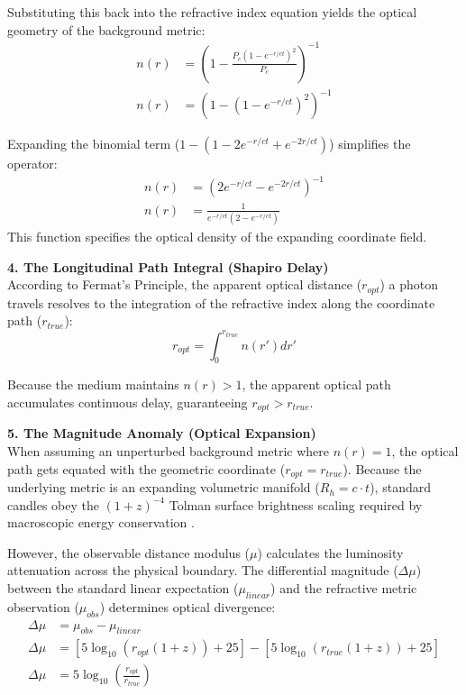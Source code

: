 Substituting this back into the refractive index equation yields the optical geometry of the background metric:
\begin{align}
    n(r) &= \left( 1 - \frac{P_c (1 - e^{-r/ct})^2}{P_c} \right)^{-1} \nonumber \\
    n(r) &= \left( 1 - (1 - e^{-r/ct})^2 \right)^{-1}
\end{align}

Expanding the binomial term ($1 - (1 - 2e^{-r/ct} + e^{-2r/ct})$) simplifies the operator:
\begin{align}
    n(r) &= \left( 2e^{-r/ct} - e^{-2r/ct} \right)^{-1} \nonumber \\
    n(r) &= \frac{1}{e^{-r/ct}(2 - e^{-r/ct})}
\end{align}
This function specifies the optical density of the expanding coordinate field.

\vspace{0.2 cm}

\textbf{4. The Longitudinal Path Integral (Shapiro Delay)} \\ 
According to Fermat's Principle, the apparent optical distance ($r_{opt}$) a photon travels resolves to the integration of the refractive index along the coordinate path ($r_{true}$):
\begin{equation}
    r_{opt} = \int_{0}^{r_{true}} n(r') dr'
\end{equation}

Because the medium maintains $n(r) > 1$, the apparent optical path accumulates continuous delay, guaranteeing $r_{opt} > r_{true}$. 

\vspace{0.2 cm}

\textbf{5. The Magnitude Anomaly (Optical Expansion)} \\ 
When assuming an unperturbed background metric where $n(r) = 1$, the optical path gets equated with the geometric coordinate ($r_{opt} = r_{true}$). Because the underlying metric is an expanding volumetric manifold ($R_h = c \cdot t$), standard candles obey the $(1+z)^{-4}$ Tolman surface brightness scaling required by macroscopic energy conservation \cite{tolman1930estimation, lubin2001tolman}.

However, the observable distance modulus ($\mu$) calculates the luminosity attenuation across the physical boundary. The differential magnitude ($\Delta\mu$) between the standard linear expectation ($\mu_{linear}$) and the refractive metric observation ($\mu_{obs}$) determines optical divergence: 
\begin{align}
    \Delta\mu &= \mu_{obs} - \mu_{linear} \nonumber \\
    \Delta\mu &= \left[ 5 \log_{10}(r_{opt}(1+z)) + 25 \right] - \left[ 5 \log_{10}(r_{true}(1+z)) + 25 \right] \nonumber \\
    \Delta\mu &= 5 \log_{10} \left( \frac{r_{opt}}{r_{true}} \right)
\end{align}


